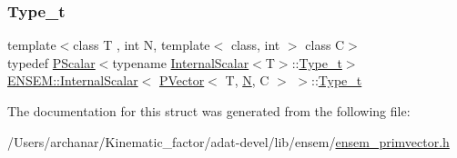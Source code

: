 \mbox{\label{structENSEM_1_1InternalScalar_3_01PVector_3_01T_00_01N_00_01C_01_4_01_4_a3d48341b473eb19411a82b36c48559cc}} 
\subsubsection{\texorpdfstring{Type\_t}{Type\_t}\hspace{0.1cm}{\footnotesize\ttfamily [3/3]}}
{\footnotesize\ttfamily template$<$class T , int N, template$<$ class, int $>$ class C$>$ \\
typedef \mbox{\hyperlink{classENSEM_1_1PScalar}{P\+Scalar}}$<$typename \mbox{\hyperlink{structENSEM_1_1InternalScalar}{Internal\+Scalar}}$<$T$>$\+::\mbox{\hyperlink{structENSEM_1_1InternalScalar_3_01PVector_3_01T_00_01N_00_01C_01_4_01_4_a3d48341b473eb19411a82b36c48559cc}{Type\+\_\+t}}$>$ \mbox{\hyperlink{structENSEM_1_1InternalScalar}{E\+N\+S\+E\+M\+::\+Internal\+Scalar}}$<$ \mbox{\hyperlink{classENSEM_1_1PVector}{P\+Vector}}$<$ T, \mbox{\hyperlink{adat__devel_2lib_2hadron_2operator__name__util_8cc_a7722c8ecbb62d99aee7ce68b1752f337}{N}}, C $>$ $>$\+::\mbox{\hyperlink{structENSEM_1_1InternalScalar_3_01PVector_3_01T_00_01N_00_01C_01_4_01_4_a3d48341b473eb19411a82b36c48559cc}{Type\+\_\+t}}}



The documentation for this struct was generated from the following file\+:\begin{DoxyCompactItemize}
\item 
/\+Users/archanar/\+Kinematic\+\_\+factor/adat-\/devel/lib/ensem/\mbox{\hyperlink{adat-devel_2lib_2ensem_2ensem__primvector_8h}{ensem\+\_\+primvector.\+h}}\end{DoxyCompactItemize}
